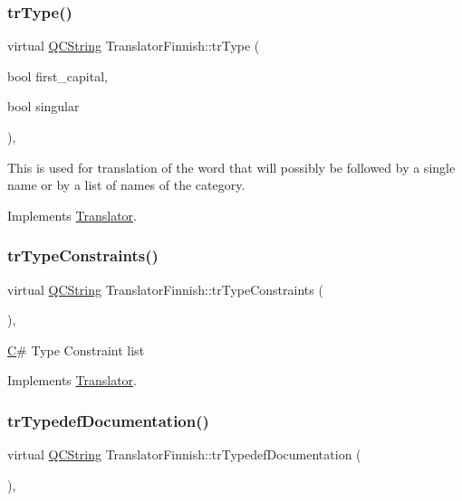 \subsubsection{\texorpdfstring{trType()}{trType()}}
{\footnotesize\ttfamily virtual \mbox{\hyperlink{class_q_c_string}{Q\+C\+String}} Translator\+Finnish\+::tr\+Type (\begin{DoxyParamCaption}\item[{bool}]{first\+\_\+capital,  }\item[{bool}]{singular }\end{DoxyParamCaption})\hspace{0.3cm}{\ttfamily [inline]}, {\ttfamily [virtual]}}

This is used for translation of the word that will possibly be followed by a single name or by a list of names of the category. 

Implements \mbox{\hyperlink{class_translator}{Translator}}.

\mbox{\label{class_translator_finnish_aaabc8d5dc3dd12146e72ae8dbe4f3025}} 
\subsubsection{\texorpdfstring{trTypeConstraints()}{trTypeConstraints()}}
{\footnotesize\ttfamily virtual \mbox{\hyperlink{class_q_c_string}{Q\+C\+String}} Translator\+Finnish\+::tr\+Type\+Constraints (\begin{DoxyParamCaption}{ }\end{DoxyParamCaption})\hspace{0.3cm}{\ttfamily [inline]}, {\ttfamily [virtual]}}

\mbox{\hyperlink{class_c}{C}}\# Type Constraint list 

Implements \mbox{\hyperlink{class_translator}{Translator}}.

\mbox{\label{class_translator_finnish_a63ef9b4bdbafe791d02b8b0b8de11071}} 
\subsubsection{\texorpdfstring{trTypedefDocumentation()}{trTypedefDocumentation()}}
{\footnotesize\ttfamily virtual \mbox{\hyperlink{class_q_c_string}{Q\+C\+String}} Translator\+Finnish\+::tr\+Typedef\+Documentation (\begin{DoxyParamCaption}{ }\end{DoxyParamCaption})\hspace{0.3cm}{\ttfamily [inline]}, {\ttfamily [virtual]}}

